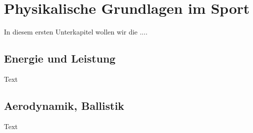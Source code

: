 
\section{Physikalische Grundlagen im Sport}\label{kap:spo_grundlagen}

In diesem ersten Unterkapitel wollen wir die ....

\subsection{Energie und Leistung} \label{kap:spo_energy}

Text

\subsection{Aerodynamik, Ballistik} \label{kap:spo_ballistcs}

Text






